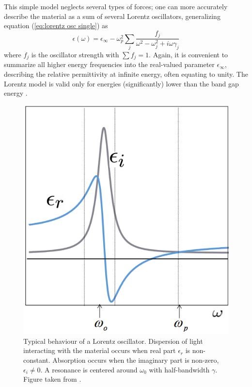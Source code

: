 This simple model neglects several types of forces\text{\color{red}[??]}; one can more accurately describe the material as a sum of several Lorentz oscillators, generalizing equation (\ref{eq:lorentz osc single}) as
\begin{equation}
    \epsilon(\omega) = \epsilon_\infty - \omega_p^2\sum_{j}\frac{f_j}{\omega^2-\omega_j^2+i\omega\gamma_j}
    \label{eq:lorentz osc sum}
\end{equation}
where $f_j$ is the oscillator strength with $\sum f_j = 1$. Again, it is convenient to summarize all higher energy frequencies into the real-valued parameter $\epsilon_\infty$, describing the relative permittivity at infinite energy, often equating to unity. The Lorentz model is valid only for energies (significantly) lower than the band gap energy .
\begin{figure}
    \centering
    \includegraphics[scale=0.3]{figures/Ch2/Lorentzian.png}
    
    \caption{Typical behaviour of a Lorentz oscillator. Dispersion of light interacting with the material occurs when real part $\epsilon_r$ is non-constant. Absorption occurs when the imaginary part is non-zero, $\epsilon_i \neq 0$. A resonance is centered around $\omega_0$ with half-bandwidth $\gamma$. Figure taken from \cite{web:lorentzMIT}.}
    \label{fig:lorentzian}
\end{figure}


